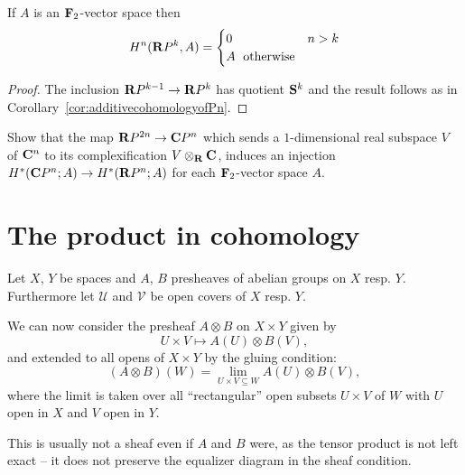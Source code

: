 \documentclass[a4paper,openany]{scrbook}
\DeclareMathOperator{\Open}{Open}
\begin{document}
\begin{corollary}\label{cor:additivecohomologyofRPn}
If $A$ is an $\F_2$-vector space then
\[
H^n(\R P^k,A) = \begin{cases} 0\; & n > k\\ A\; \text{ otherwise}\end{cases}
\]
\end{corollary}
\begin{proof}
The inclusion $\R P^{k-1} \to \R P^k$ has quotient $\S^k$ and the result follows as in Corollary~\ref{cor:additivecohomologyofPn}. 
\end{proof}

\begin{exer}\label{exer:complexificationincohomology}
Show that the map $\R P^{2n} \to \CP^n$ which sends a $1$-dimensional real subspace $V$ of $\CC^n$ to its complexification $V \otimes_\R \CC$, induces an injection $H^*(\CP^n;A) \to H^*(\R P^n;A)$ for each $\F_2$-vector space $A$.
\end{exer}

\section{The product in cohomology}

Let $X$, $Y$ be spaces and $A$, $B$ presheaves of abelian groups on $X$ resp. $Y$. Furthermore let $\mathcal U$ and $\mathcal V$ be open covers of $X$ resp. $Y$. 

We can now consider the presheaf $A \otimes B$ on $X \times Y$ given by
\[
U \times V \mapsto A(U) \otimes B(V),
\]
and extended to all opens of $X \times Y$ by the gluing condition:
\[
(A \otimes B)(W) = \lim_{U \times V \subseteq W} A(U) \otimes B(V),
\]
where the limit is taken over all ``rectangular'' open subsets $U \times V$ of $W$ with $U$ open in $X$ and $V$ open in $Y$.

This is usually not a sheaf even if $A$ and $B$ were, as the tensor product is not left exact -- it does not preserve the equalizer diagram in the sheaf condition. 

\end{document}
